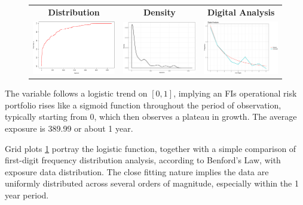 \documentclass{DissertateUSU}
\begin{document}
\begin{figure}
\begin{frame}
      \centering
       \begin{tabular}{ccc}
        \textbf{Distribution} & \textbf{Density} & \textbf{Digital Analysis} \\
        \includegraphics[width=5cm]{Exposure_cdf.eps}
         &
         \includegraphics[width=5cm]{Dist_exposure.eps}
         &
         \includegraphics[width=5cm]{Benford.eps}
         \end{tabular}
    \end{frame}
    \label{Exploration_analysis_exposure}
\end{figure}

The variable follows a logistic trend on \([0,1]\), implying an FIs
operational risk portfolio rises like a sigmoid function throughout the
period of observation, typically starting from \(0\), which then
observes a plateau in growth. The average exposure is 389.99 or about 1
year.\medskip

Grid plots \ref{Exploration_analysis_exposure} portray the logistic
function, together with a simple comparison of first-digit frequency
distribution analysis, according to Benford's Law, with exposure data
distribution. The close fitting nature implies the data are uniformly
distributed across several orders of magnitude, especially within the 1
year period.\medskip
\end{document}
